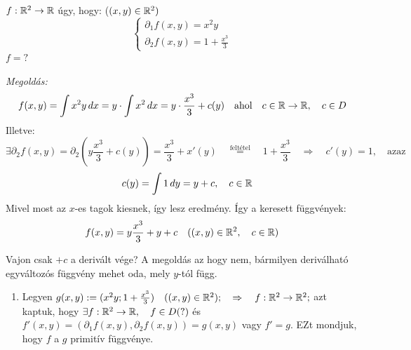 \documentclass[a4paper,11.5pt]{article}
\begin{document}
	\begin{task}$f:\mathbb{R}^2\to\mathbb{R}$ úgy, hogy: \quad ($(x,y)\in\mathbb{R}^2)$
		\[ \begin{cases}
			\partial_1f(x,y)=x^2y\\
			\partial_2f(x,y)=1+\frac{x^3}{3}
		\end{cases} \]
		$f=?$
		
		\textit{Megoldás:} 
		\[f(x,y)=\int x^2y\,dx =y\cdot\int x^2\,dx=y\cdot\frac{x^3}{3}+c(y)\quad \text{ahol}\quad c\in\mathbb{R}\to\mathbb{R},\quad c\in D \]
		Illetve:
		\[ \exists\partial_2f(x,y)=\partial_2\left(y\frac{x^3}{3}+c(y)\right)=\frac{x^3}{3}+x'(y)\quad \overset{\text{feltétel}}{=}\quad 1+\frac{x^3}{3}\quad \Rightarrow\quad c'(y)=1, \quad \text{azaz}\]
		\[\quad c(y)=\int1\,dy=y+c, \quad c\in\mathbb{R} \]
		Mivel most az $x$-es tagok kiesnek, így lesz eredmény. 
		Így a keresett függvények:
		\[ f(x,y)=y\frac{x^3}{3}+y+c\quad ((x,y)\in\mathbb{R}^2,\quad c\in\mathbb{R}) \]
	\end{task}
	\begin{note}
		Vajon csak $+c$ a derivált vége? A megoldás az hogy nem, bármilyen deriválható egyváltozós függvény mehet oda, mely $y$-tól függ.
	\end{note}
	\begin{note}
		\begin{enumerate}
			\item Legyen $g(x,y):=(x^2y;1+\frac{x^3}{3})\quad ((x,y)\in\mathbb{R}^2);\quad \Rightarrow\quad f:\mathbb{R}^2\to\mathbb{R}^2;$ azt kaptuk, hogy $\exists f:\mathbb{R}^2\to\mathbb{R},\quad f\in D (?)$ és $f'(x,y)=(\partial_1f(x,y),\partial_2f(x,y))=g(x,y)$ vagy $f'=g$. EZt mondjuk, hogy $f$ a $g$ primitív függvénye.
		\end{enumerate}
	\end{note}
\end{document}
